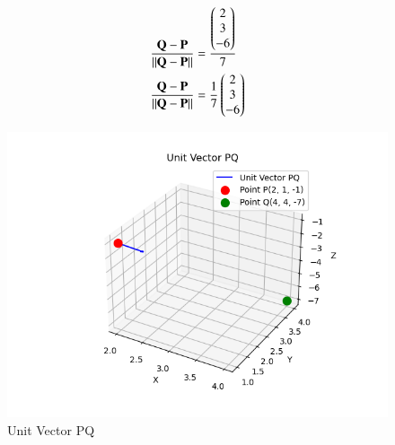 \documentclass[journal]{IEEEtran}
\begin{document}
\begin{align}
    \frac{\mathbf{Q} - \mathbf{P}}{\left\lVert\mathbf{Q} - \mathbf{P}\right\rVert} & = \frac{\begin{pmatrix}2 \\ 3 \\-6\end{pmatrix}}{7} \\
    \frac{\mathbf{Q} - \mathbf{P}}{\left\lVert\mathbf{Q} - \mathbf{P}\right\rVert} & = \frac{1}{7}\begin{pmatrix}2 \\ 3 \\ -6\end{pmatrix}
\end{align}
\begin{figure}[h!]
   \centering
   \includegraphics[width=0.7\linewidth]{figs/unit.png}
	\caption{Unit Vector PQ}
   \end{figure}
   
\end{document}
